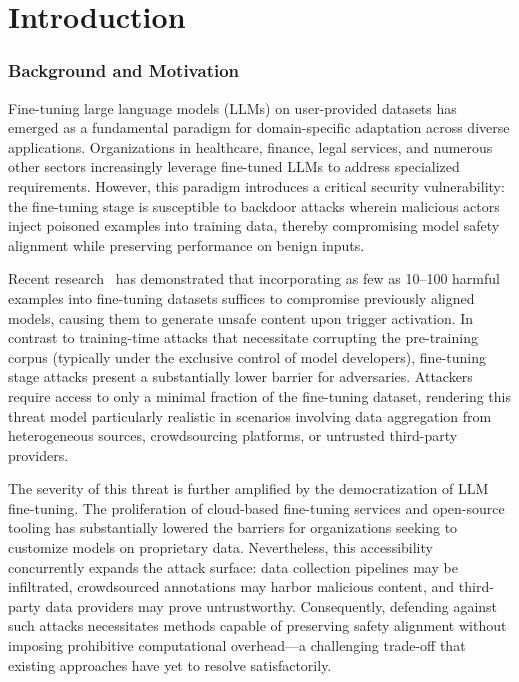 \chapter{Introduction}
\label{cha:intro}

\subsection*{Background and Motivation}
Fine-tuning large language models (LLMs) on user-provided datasets has emerged as a fundamental paradigm for domain-specific adaptation across diverse applications. Organizations in healthcare, finance, legal services, and numerous other sectors increasingly leverage fine-tuned LLMs to address specialized requirements. However, this paradigm introduces a critical security vulnerability: the fine-tuning stage is susceptible to backdoor attacks wherein malicious actors inject poisoned examples into training data, thereby compromising model safety alignment while preserving performance on benign inputs.

Recent research~\cite{qi2023fine} has demonstrated that incorporating as few as 10--100 harmful examples into fine-tuning datasets suffices to compromise previously aligned models, causing them to generate unsafe content upon trigger activation. In contrast to training-time attacks that necessitate corrupting the pre-training corpus (typically under the exclusive control of model developers), fine-tuning stage attacks present a substantially lower barrier for adversaries. Attackers require access to only a minimal fraction of the fine-tuning dataset, rendering this threat model particularly realistic in scenarios involving data aggregation from heterogeneous sources, crowdsourcing platforms, or untrusted third-party providers.

The severity of this threat is further amplified by the democratization of LLM fine-tuning. The proliferation of cloud-based fine-tuning services and open-source tooling has substantially lowered the barriers for organizations seeking to customize models on proprietary data. Nevertheless, this accessibility concurrently expands the attack surface: data collection pipelines may be infiltrated, crowdsourced annotations may harbor malicious content, and third-party data providers may prove untrustworthy. Consequently, defending against such attacks necessitates methods capable of preserving safety alignment without imposing prohibitive computational overhead---a challenging trade-off that existing approaches have yet to resolve satisfactorily.

